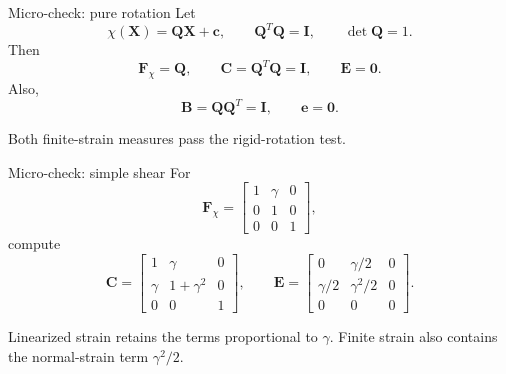 \documentclass[aspectratio=169,11pt]{beamer}
\newcommand{\X}{\bm{X}}
\newcommand{\I}{\bm{I}}
\newcommand{\Fdef}{\bm{F}_{\chi}}
\newcommand{\Cten}{\bm{C}}
\newcommand{\Bten}{\bm{B}}
\newcommand{\Eten}{\bm{E}}
\newcommand{\eten}{\bm{e}}
\begin{document}
\begin{frame}{Micro-check: pure rotation}
Let
\[
  \chi(\X)=\bm{Q}\X+\bm{c},
  \qquad
  \bm{Q}^T\bm{Q}=\I,
  \qquad
  \det\bm{Q}=1.
\]
Then
\[
  \Fdef=\bm{Q},
  \qquad
  \Cten=\bm{Q}^T\bm{Q}=\I,
  \qquad
  \Eten=\bm{0}.
\]
Also,
\[
  \Bten=\bm{Q}\bm{Q}^T=\I,
  \qquad
  \eten=\bm{0}.
\]
\begin{punchbox}
\small
Both finite-strain measures pass the rigid-rotation test.
\end{punchbox}
\end{frame}

\begin{frame}{Micro-check: simple shear}
For
\[
  \Fdef=
  \begin{bmatrix}
    1&\gamma&0\\
    0&1&0\\
    0&0&1
  \end{bmatrix},
\]
compute
\[
  \Cten=
  \begin{bmatrix}
    1&\gamma&0\\
    \gamma&1+\gamma^2&0\\
    0&0&1
  \end{bmatrix},
\qquad
  \Eten=
  \begin{bmatrix}
    0&\gamma/2&0\\
    \gamma/2&\gamma^2/2&0\\
    0&0&0
  \end{bmatrix}.
\]
\begin{punchbox}
\small
Linearized strain retains the terms proportional to \(\gamma\). Finite strain also contains the normal-strain term \(\gamma^2/2\).
\end{punchbox}
\end{frame}
\end{document}
